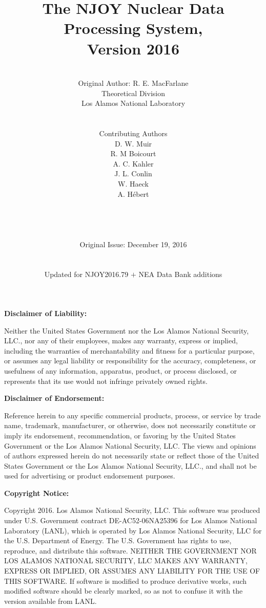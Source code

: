 \documentclass[11pt,twoside]{NJOYMan}
\title{\bf The NJOY Nuclear Data Processing System,\\Version 2016}
\author{\\
  Original Author:  R. E. MacFarlane\\
  Theoretical Division\\
  Los Alamos National Laboratory\\
\\
\\
Contributing Authors\\
D. W. Muir\\
R. M Boicourt\\
A. C. Kahler\\
J. L. Conlin\\
W. Haeck\\
A. Hébert\\
\\
\\
\\
\\
Original Issue:  December 19, 2016\\
\\
\\
Updated for NJOY2016.79 $+$ NEA Data Bank additions
\\}
\renewcommand{\headrulewidth}{0pt}     %
\renewcommand{\footrulewidth}{0pt}}    %
\begin{document}
\maketitle
{}

\clearpage
\fancyhf{}                           %
%
\renewcommand{\headrulewidth}{0pt}   %
\renewcommand{\footrulewidth}{0pt}   %

%
\begin{center} \textbf{Disclaimer of Liability:} \end{center}
Neither the United States Government nor the Los Alamos
National Security, LLC., nor any of their employees, makes any warranty,
express or implied, including the warranties of merchantability and
fitness for a particular purpose, or assumes any legal liability or
responsibility for the accuracy, completeness, or usefulness of any
information, apparatus, product, or process disclosed, or represents
that its use would not infringe privately owned rights.

\vspace{0.25in}
\begin{center} \textbf{Disclaimer of Endorsement:} \end{center}
Reference herein to any specific commercial products,
process, or service by trade name, trademark, manufacturer, or otherwise,
does not necessarily constitute or imply its endorsement, recommendation,
or favoring by the United States Government or the Los Alamos National
Security, LLC. The views and opinions of authors expressed herein do not
necessarily state or reflect those of the United States Government or
the Los Alamos National Security, LLC., and shall not be used for
advertising or product endorsement purposes.

\vspace{0.25in}
\begin{center} \textbf{Copyright Notice:} \end{center}
Copyright 2016. Los Alamos National Security, LLC. This software was
produced under U.S. Government contract DE-AC52-06NA25396 for
Los Alamos National Laboratory (LANL), which is operated by
Los Alamos National Security, LLC for the U.S. Department of
Energy. The U.S. Government has rights to use, reproduce, and
distribute this software.  NEITHER THE GOVERNMENT NOR LOS ALAMOS
NATIONAL SECURITY, LLC MAKES ANY WARRANTY, EXPRESS OR IMPLIED, OR
ASSUMES ANY LIABILITY FOR THE USE OF THIS SOFTWARE.  If software
is modified to produce derivative works, such modified software
should be clearly marked, so as not to confuse it with the version
available from LANL.
\end{document}
